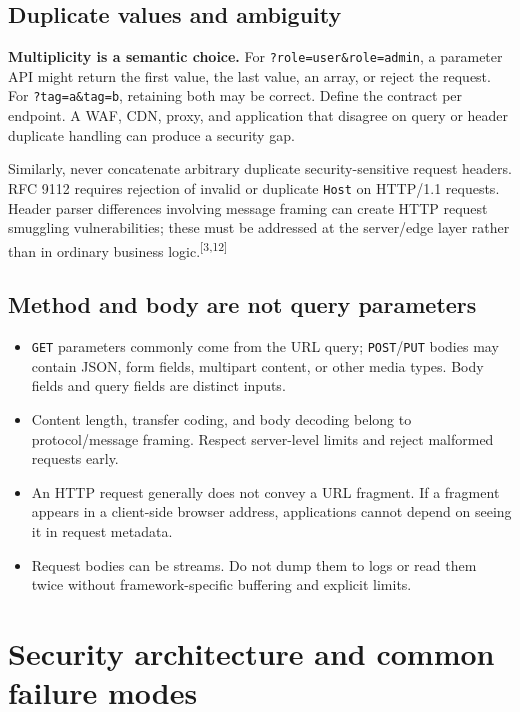 \documentclass[10pt,letterpaper,oneside]{article}
\newcommand{\refs}[1]{\textsuperscript{\color{blue}[#1]}}
\newcommand{\code}[1]{\texttt{#1}}
\begin{document}
\subsection{Duplicate values and ambiguity}
\begin{keybox}
\textbf{Multiplicity is a semantic choice.} For \code{?role=user\&role=admin}, a parameter API might return the first value, the last value, an array, or reject the request. For \code{?tag=a\&tag=b}, retaining both may be correct. Define the contract per endpoint. A WAF, CDN, proxy, and application that disagree on query or header duplicate handling can produce a security gap.
\end{keybox}
Similarly, never concatenate arbitrary duplicate security-sensitive request headers. RFC 9112 requires rejection of invalid or duplicate \code{Host} on HTTP/1.1 requests. Header parser differences involving message framing can create HTTP request smuggling vulnerabilities; these must be addressed at the server/edge layer rather than in ordinary business logic.\refs{3,12}

\subsection{Method and body are not query parameters}
\begin{itemize}
\item \code{GET} parameters commonly come from the URL query; \code{POST}/\code{PUT} bodies may contain JSON, form fields, multipart content, or other media types. Body fields and query fields are distinct inputs.
\item Content length, transfer coding, and body decoding belong to protocol/message framing. Respect server-level limits and reject malformed requests early.
\item An HTTP request generally does not convey a URL fragment. If a fragment appears in a client-side browser address, applications cannot depend on seeing it in request metadata.
\item Request bodies can be streams. Do not dump them to logs or read them twice without framework-specific buffering and explicit limits.
\end{itemize}

\section{Security architecture and common failure modes}
\end{document}
